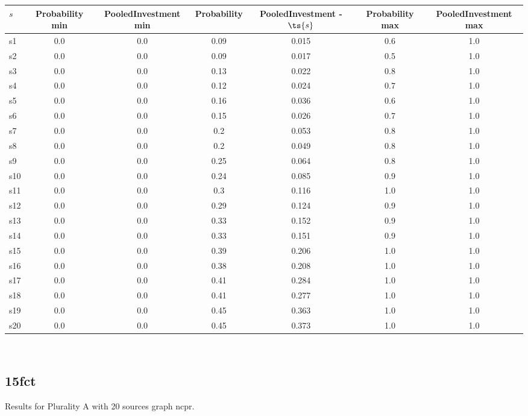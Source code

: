 \documentclass{article}
\begin{document}
\noindent\begin{tabular}{|l|c|c|c|c|c|c|}
\hline
$s$& Probability min & PooledInvestment min & Probability & PooledInvestment - $\ts{s}$ & Probability max & PooledInvestment max\\
\hline
s1 &0.0 & 0.0 & 0.09 & 0.015 & 0.6 & 1.0\\
\hline
s2 &0.0 & 0.0 & 0.09 & 0.017 & 0.5 & 1.0\\
\hline
s3 &0.0 & 0.0 & 0.13 & 0.022 & 0.8 & 1.0\\
\hline
s4 &0.0 & 0.0 & 0.12 & 0.024 & 0.7 & 1.0\\
\hline
s5 &0.0 & 0.0 & 0.16 & 0.036 & 0.6 & 1.0\\
\hline
s6 &0.0 & 0.0 & 0.15 & 0.026 & 0.7 & 1.0\\
\hline
s7 &0.0 & 0.0 & 0.2 & 0.053 & 0.8 & 1.0\\
\hline
s8 &0.0 & 0.0 & 0.2 & 0.049 & 0.8 & 1.0\\
\hline
s9 &0.0 & 0.0 & 0.25 & 0.064 & 0.8 & 1.0\\
\hline
s10 &0.0 & 0.0 & 0.24 & 0.085 & 0.9 & 1.0\\
\hline
s11 &0.0 & 0.0 & 0.3 & 0.116 & 1.0 & 1.0\\
\hline
s12 &0.0 & 0.0 & 0.29 & 0.124 & 0.9 & 1.0\\
\hline
s13 &0.0 & 0.0 & 0.33 & 0.152 & 0.9 & 1.0\\
\hline
s14 &0.0 & 0.0 & 0.33 & 0.151 & 0.9 & 1.0\\
\hline
s15 &0.0 & 0.0 & 0.39 & 0.206 & 1.0 & 1.0\\
\hline
s16 &0.0 & 0.0 & 0.38 & 0.208 & 1.0 & 1.0\\
\hline
s17 &0.0 & 0.0 & 0.41 & 0.284 & 1.0 & 1.0\\
\hline
s18 &0.0 & 0.0 & 0.41 & 0.277 & 1.0 & 1.0\\
\hline
s19 &0.0 & 0.0 & 0.45 & 0.363 & 1.0 & 1.0\\
\hline
s20 &0.0 & 0.0 & 0.45 & 0.373 & 1.0 & 1.0\\
\hline
\end{tabular}\\

\newpage

\subsection{15fct}

\noindent Results for Plurality A with 20 sources graph ncpr.
\end{document}
